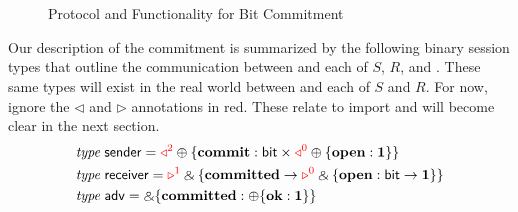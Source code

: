 \begin{figure*}
\centering
\begin{subfigure}{.4\textwidth}

\end{subfigure}%
\hspace{2em}
\begin{subfigure}{.5\textwidth}

\end{subfigure}%
\\[3ex]
\begin{subfigure}{\linewidth}

\end{subfigure}
\\[3ex]
\begin{subfigure}{\linewidth}

\end{subfigure}
\caption{Protocol and Functionality for Bit Commitment}
\label{fig:fcom}
\end{figure*}

Our description of the commitment is summarized by the following binary session
types that outline the communication between \Fcom and each of $S$, $R$, and
\A.  These same types will exist in the real world between \Z and each of $S$
and $R$.  For now, ignore the $\triangleleft$ and $\triangleright$ annotations
in red.  These relate to import and will become clear in the next section.
\begin{align*}
  &\relax{\it type} \; \mathsf{sender} = \textcolor{red}{\triangleleft^2} \oplus \{ \mathbf{commit} : \mathsf{bit} \times \textcolor{red}{\triangleleft^0} \oplus \{ \mathbf{open} : \mathbf{1} \} \} \\
  &\relax{\it type} \; \mathsf{receiver} = \textcolor{red}{\triangleright^1} \mathbin{\binampersand} \{ \mathbf{committed} \rightarrow \textcolor{red}{\triangleright^0} \mathbin{\binampersand} \{ \mathbf{open}: \mathsf{bit} \rightarrow \mathbf{1} \} \} \\
  &\relax{\it type} \; \mathsf{adv} = \mathbin{\binampersand} \{ \mathbf{committed}: \oplus \{ \mathbf{ok}: \mathbf{1} \} \}
\end{align*}

